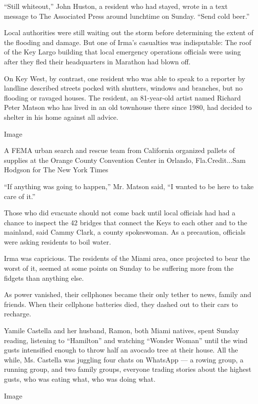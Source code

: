 ``Still whiteout,'' John Huston, a resident who had stayed, wrote in a
text message to The Associated Press around lunchtime on Sunday. ``Send
cold beer.''

Local authorities were still waiting out the storm before determining
the extent of the flooding and damage. But one of Irma's casualties was
indisputable: The roof of the Key Largo building that local emergency
operations officials were using after they fled their headquarters in
Marathon had blown off.

On Key West, by contrast, one resident who was able to speak to a
reporter by landline described streets pocked with shutters, windows and
branches, but no flooding or ravaged houses. The resident, an
81-year-old artist named Richard Peter Matson who has lived in an old
townhouse there since 1980, had decided to shelter in his home against
all advice.

Image

A FEMA urban search and rescue team from California organized pallets of
supplies at the Orange County Convention Center in Orlando,
Fla.Credit...Sam Hodgson for The New York Times

``If anything was going to happen,'' Mr. Matson said, ``I wanted to be
here to take care of it.''

Those who did evacuate should not come back until local officials had
had a chance to inspect the 42 bridges that connect the Keys to each
other and to the mainland, said Cammy Clark, a county spokeswoman. As a
precaution, officials were asking residents to boil water.

Irma was capricious. The residents of the Miami area, once projected to
bear the worst of it, seemed at some points on Sunday to be suffering
more from the fidgets than anything else.

As power vanished, their cellphones became their only tether to news,
family and friends. When their cellphone batteries died, they dashed out
to their cars to recharge.

Yamile Castella and her husband, Ramon, both Miami natives, spent Sunday
reading, listening to ``Hamilton'' and watching ``Wonder Woman'' until
the wind gusts intensified enough to throw half an avocado tree at their
house. All the while, Ms. Castella was juggling four chats on WhatsApp
--- a rowing group, a running group, and two family groups, everyone
trading stories about the highest gusts, who was eating what, who was
doing what.

Image

